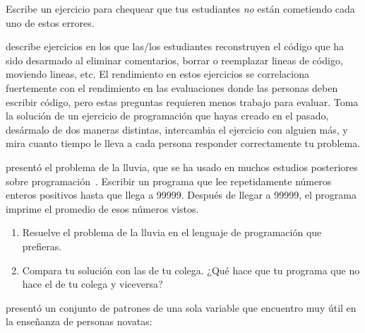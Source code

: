 \noindent
Escribe un ejercicio para chequear que tus estudiantes \emph{no} están cometiendo cada uno de estos errores.


\cite{Chen2017} describe ejercicios en los que las/los estudiantes reconstruyen el código que ha sido desarmado
al eliminar comentarios,
borrar o reemplazar lineas de código,
moviendo lineas,
etc.
El rendimiento en estos ejercicios se correlaciona fuertemente con el rendimiento en las evaluaciones
donde las personas deben escribir código,
pero estas preguntas requieren menos trabajo para evaluar.
Toma la solución de un ejercicio de programación que hayas creado en el pasado,
desármalo de dos maneras distintas,
intercambia el ejercicio con alguien más,
y mira cuanto tiempo le lleva a cada persona responder correctamente tu problema.


\cite{Solo1986} presentó el problema de la lluvia,
que se ha usado en muchos estudios posteriores sobre programación~\cite{Fisl2014,Simo2013,Sepp2015}.
Escribir un programa que lee repetidamente números enteros positivos hasta que llega a 99999.
Después de llegar a 99999,
el programa imprime el promedio de esos números vistos.

\begin{enumerate}

\item
  Resuelve el problema de la lluvia en el lenguaje de programación que prefieras.

\item
  Compara tu solución con las de tu colega.
  ¿Qué hace que tu programa que no hace el de tu colega y viceversa?

\end{enumerate}


\cite{Kuit2004,Byck2005,Saja2006} presentó un conjunto de patrones de una sola variable
que encuentro muy útil en la enseñanza de personas novatas:

